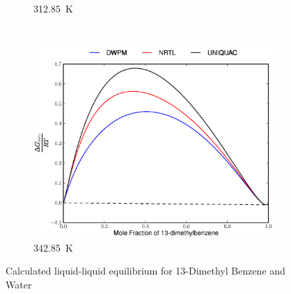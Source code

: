 \begin{figure}[hp]
\begin{subfigure}[h]{0.5\textwidth}
	\caption{312.85~$\mathrm{K}$} 
\end{subfigure}%
\\%
\begin{subfigure}[h]{0.5\textwidth}
\centering
\includegraphics[width = \textwidth]{Results_Parts/BinaryParams/13-dimethylbenzene-water/AllModelsGibbsPlots/T_342.85.eps}
\caption{342.85~$\mathrm{K}$} 
\end{subfigure}%
\caption{Calculated liquid-liquid equilibrium for 13-Dimethyl Benzene and Water}
\end{figure}
\vspace*{\fill}
\clearpage
